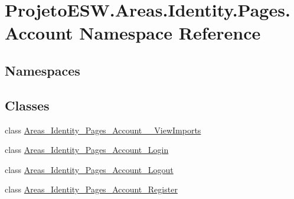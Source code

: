 \hypertarget{namespace_projeto_e_s_w_1_1_areas_1_1_identity_1_1_pages_1_1_account}{}\section{Projeto\+E\+S\+W.\+Areas.\+Identity.\+Pages.\+Account Namespace Reference}
\label{namespace_projeto_e_s_w_1_1_areas_1_1_identity_1_1_pages_1_1_account}
\subsection*{Namespaces}
\begin{DoxyCompactItemize}
\end{DoxyCompactItemize}
\subsection*{Classes}
\begin{DoxyCompactItemize}
\item 
class \mbox{\hyperlink{class_projeto_e_s_w_1_1_areas_1_1_identity_1_1_pages_1_1_account_1_1_areas___identity___pages___account_____view_imports}{Areas\+\_\+\+Identity\+\_\+\+Pages\+\_\+\+Account\+\_\+\+\_\+\+View\+Imports}}
\item 
class \mbox{\hyperlink{class_projeto_e_s_w_1_1_areas_1_1_identity_1_1_pages_1_1_account_1_1_areas___identity___pages___account___login}{Areas\+\_\+\+Identity\+\_\+\+Pages\+\_\+\+Account\+\_\+\+Login}}
\item 
class \mbox{\hyperlink{class_projeto_e_s_w_1_1_areas_1_1_identity_1_1_pages_1_1_account_1_1_areas___identity___pages___account___logout}{Areas\+\_\+\+Identity\+\_\+\+Pages\+\_\+\+Account\+\_\+\+Logout}}
\item 
class \mbox{\hyperlink{class_projeto_e_s_w_1_1_areas_1_1_identity_1_1_pages_1_1_account_1_1_areas___identity___pages___account___register}{Areas\+\_\+\+Identity\+\_\+\+Pages\+\_\+\+Account\+\_\+\+Register}}
\end{DoxyCompactItemize}
